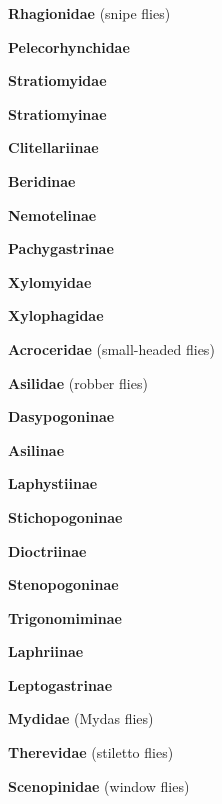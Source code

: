 \documentclass[letterpaper,10pt]{article}
\begin{document}
{\makebox[0.6cm]{}  \textbf{Rhagionidae} (snipe flies) \par
\makebox[0.6cm]{}  \textbf{Pelecorhynchidae} \par
\makebox[0.6cm]{}  \textbf{Stratiomyidae} \par
\makebox[0.8cm]{}  \textbf{Stratiomyinae} \par
\makebox[0.8cm]{}  \textbf{Clitellariinae} \par
\makebox[0.8cm]{}  \textbf{Beridinae} \par
\makebox[0.8cm]{}  \textbf{Nemotelinae} \par
\makebox[0.8cm]{}  \textbf{Pachygastrinae} \par
\makebox[0.6cm]{}  \textbf{Xylomyidae}  \par
\makebox[0.6cm]{}  \textbf{Xylophagidae} \par
\makebox[0.6cm]{}  \textbf{Acroceridae} (small-headed flies) \par
\makebox[0.6cm]{}  \textbf{Asilidae} (robber flies) \par
\makebox[0.8cm]{}  \textbf{Dasypogoninae} \par
\makebox[0.8cm]{}  \textbf{Asilinae} \par
\makebox[0.8cm]{}  \textbf{Laphystiinae} \par
\makebox[0.8cm]{}  \textbf{Stichopogoninae} \par
\makebox[0.8cm]{}  \textbf{Dioctriinae} \par
\makebox[0.8cm]{}  \textbf{Stenopogoninae} \par
\makebox[0.8cm]{}  \textbf{Trigonomiminae} \par
\makebox[0.8cm]{}  \textbf{Laphriinae} \par
\makebox[0.8cm]{}  \textbf{Leptogastrinae} \par
\makebox[0.6cm]{}  \textbf{Mydidae} (Mydas flies) \par
\makebox[0.6cm]{}  \textbf{Therevidae} (stiletto flies) \par
\makebox[0.6cm]{}  \textbf{Scenopinidae} (window flies) \par
}
\end{document}
